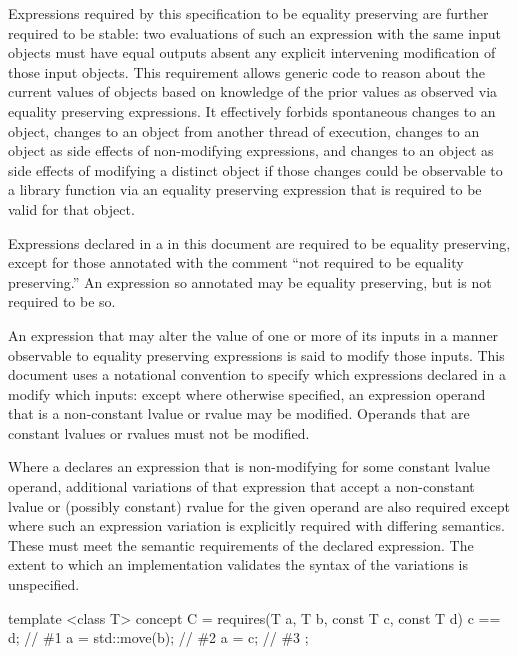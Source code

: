 \begin{addedblock}
\pnum
Expressions required by this specification to be equality preserving are
further required to be stable: two evaluations of such an expression with the same
input objects must have equal outputs absent any
explicit intervening modification of those input objects.
\enternote This requirement allows generic code to reason
about the current values of objects based on knowledge of the prior values as
observed via equality preserving expressions. It effectively forbids spontaneous
changes to an object, changes to an object from another thread of execution, changes
to an object as side effects of non-modifying expressions, and changes to an object as
side effects of modifying a distinct object if those changes could be observable
to a library function via an equality preserving expression that is required to be
valid for that object. \exitnote

\pnum
Expressions declared in a  in this document are
required to be equality preserving, except for those annotated with the comment
``not required to be equality preserving.'' An expression so annotated
may be equality preserving, but is not required to be so.

\pnum
An expression that may alter the value of one or more of its inputs in a manner
observable to equality preserving expressions is said to modify those inputs.
This document uses a notational convention to specify which expressions declared
in a  modify which inputs: except where otherwise
specified, an expression operand that is a non-constant lvalue or rvalue may be
modified. Operands that are constant lvalues or rvalues must not be modified.

\pnum
Where a  declares an expression that is non-modifying
for some constant lvalue operand, additional variations of that expression that accept
a non-constant lvalue or (possibly constant) rvalue for the given operand are also
required except where such an expression variation is explicitly required with
differing semantics. These  must meet the semantic
requirements of the declared expression. The extent to which an implementation
validates the syntax of the variations is unspecified.

\enterexample
\begin{codeblock}
template <class T>
concept C =
  requires(T a, T b, const T c, const T d) {
    c == d;           // \#1
    a = std::move(b); // \#2
    a = c;            // \#3
  };
\end{codeblock}


\end{addedblock}
